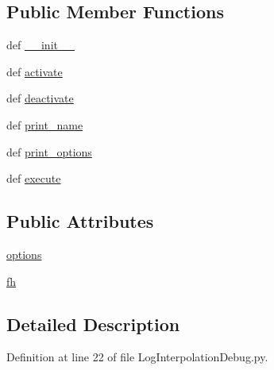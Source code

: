 \subsection*{Public Member Functions}
\begin{DoxyCompactItemize}
\item 
def \hyperlink{class_log_interpolation_debug_1_1_log_interpolation_debug_a201711bed69102c7c3fd165d1c7b12ad}{\-\_\-\-\_\-init\-\_\-\-\_\-}
\item 
def \hyperlink{class_log_interpolation_debug_1_1_log_interpolation_debug_a9535a99860f346ecb99f09dda5551c2a}{activate}
\item 
def \hyperlink{class_log_interpolation_debug_1_1_log_interpolation_debug_abb9ac99c2e5cc3a07f2fc1d4ea08ed61}{deactivate}
\item 
def \hyperlink{class_log_interpolation_debug_1_1_log_interpolation_debug_a785191d045075fe25060f0a68d898a00}{print\-\_\-name}
\item 
def \hyperlink{class_log_interpolation_debug_1_1_log_interpolation_debug_af05b06ca2fa74049271a45fd78863edd}{print\-\_\-options}
\item 
def \hyperlink{class_log_interpolation_debug_1_1_log_interpolation_debug_a20508d0435e1abd39a940f4beda2a065}{execute}
\end{DoxyCompactItemize}
\subsection*{Public Attributes}
\begin{DoxyCompactItemize}
\item 
\hyperlink{class_log_interpolation_debug_1_1_log_interpolation_debug_a867dc9203570065ce846fd0d24434695}{options}
\item 
\hyperlink{class_log_interpolation_debug_1_1_log_interpolation_debug_a8b8ec0df24628757f23bd8208dbca19c}{fh}
\end{DoxyCompactItemize}


\subsection{Detailed Description}


Definition at line 22 of file Log\-Interpolation\-Debug.\-py.



